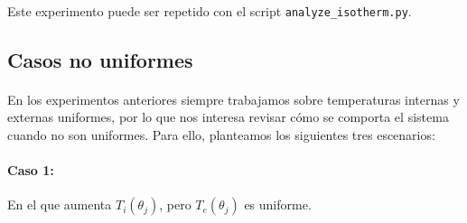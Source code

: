 \documentclass[12pt]{article}
\begin{document}
\paragraph{} Este experimento puede ser repetido con el script \texttt{analyze\_isotherm.py}.




\subsection{Casos no uniformes}

\paragraph{} En los experimentos anteriores siempre trabajamos sobre temperaturas internas y externas uniformes, por lo que nos interesa revisar cómo se comporta el sistema cuando no son uniformes. Para ello, planteamos los siguientes tres escenarios:

\paragraph{Caso 1:} En el que aumenta \(T_i(\theta_j)\), pero \(T_e(\theta_{j})\) es uniforme.
\end{document}
